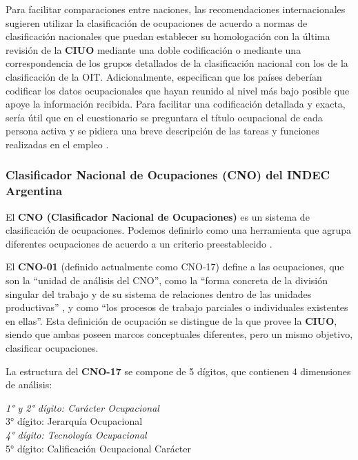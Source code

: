\documentclass[
]{book}
\begin{document}
Para facilitar comparaciones entre naciones, las recomendaciones internacionales sugieren utilizar la clasificación de ocupaciones de acuerdo a normas de clasificación nacionales que puedan establecer su homologación con la última revisión de la \textbf{CIUO} mediante una doble codificación o mediante una correspondencia de los grupos detallados de la clasificación nacional con los de la clasificación de la OIT. Adicionalmente, especifican que los países deberían codificar los datos ocupacionales que hayan reunido al nivel más bajo posible que apoye la información recibida. Para facilitar una codificación detallada y exacta, sería útil que en el cuestionario se preguntara el título ocupacional de cada persona activa y se pidiera una breve descripción de las tareas y funciones realizadas en el empleo \citep[pp.~179-180]{ONUOIT2010}.

\hypertarget{clasificador-nacional-de-ocupaciones-cno-del-indec-argentina}{%
\subsubsection{Clasificador Nacional de Ocupaciones (CNO) del INDEC Argentina}\label{clasificador-nacional-de-ocupaciones-cno-del-indec-argentina}}

El \textbf{CNO (Clasificador Nacional de Ocupaciones)} es un sistema de clasificación de ocupaciones. Podemos definirlo como una herramienta que agrupa diferentes ocupaciones de acuerdo a un criterio preestablecido \citep{ChavezMolina.etal2020}.

El \textbf{CNO-01} (definido actualmente como CNO-17) define a las ocupaciones, que son la ``unidad de análisis del CNO'', como la ``forma concreta de la división singular del trabajo y de su sistema de relaciones dentro de las unidades productivas'' \citep[pp.~16]{INDEC2005}, y como ``los procesos de trabajo parciales o individuales existentes en ellas''. Esta definición de ocupación se distingue de la que provee la \textbf{CIUO}, siendo que ambas poseen marcos conceptuales diferentes, pero un mismo objetivo, clasificar ocupaciones.

La estructura del \textbf{CNO-17} se compone de 5 dígitos, que contienen 4 dimensiones de análisis:

\emph{1° y 2° dígito: Carácter Ocupacional\\
}3° dígito: Jerarquía Ocupacional\\
\emph{4° dígito: Tecnología Ocupacional\\
}5° dígito: Calificación Ocupacional Carácter
\end{document}
